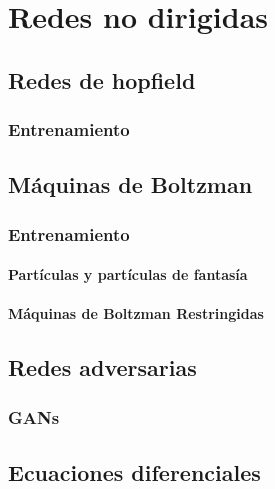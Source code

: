 \documentclass[12pt,openany]{book}
\begin{document}
\part{Redes no dirigidas}
\chapter{Redes de hopfield}
\section{Entrenamiento}

\chapter{Máquinas de Boltzman}
\section{Entrenamiento}
\subsection{Partículas y partículas de fantasía}
\subsection{Máquinas de Boltzman Restringidas}

\chapter{Redes adversarias}
\section{GANs}

\appendix 
\chapter{Ecuaciones diferenciales}

\backmatter

\printbibliography[heading=bibintoc]
\end{document}
